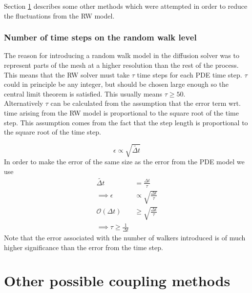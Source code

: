 Section \ref{other_possible_coupling_methods} describes some other methods which were attempted in order to reduce the fluctuations from the RW model.

\subsubsection{Number of time steps on the random walk level}

The reason for introducing a random walk model in the diffusion solver was to represent parts of the mesh at a higher resolution than the rest of the process. 
This means that the RW solver must take $\tau$ time steps for each PDE time step. 
$\tau$ could in principle be any integer, but should be chosen large enough so the central limit theorem is satisfied. 
This usually means $\tau\geq50$. \\
Alternatively $\tau$ can be calculated from the assumption that the error term wrt. time arising from the RW model is proportional to the square root of the time step. 
This assumption comes from the fact that the step length is proportional to the square root of the time step.

\begin{equation}
 \epsilon \propto \sqrt{\tilde{\Delta t}}
\end{equation}
In order to make the error of the same size as the error from the PDE model we use 
\begin{align*}
 \tilde{\Delta t} &= \frac{\Delta t}{\tau} \\
 \implies \epsilon &\propto \sqrt{\frac{\Delta t}{\tau}} \\
 \mathcal{O}(\Delta t) &\geq \sqrt{\frac{\Delta t}{\tau}} \\
 \implies \tau \geq \frac{1}{\Delta t}
\end{align*}
\noindent Note that the error associated with the number of walkers introduced is of much higher significance than the error from the time step.

\section{Other possible coupling methods}\label{other_possible_coupling_methods}

